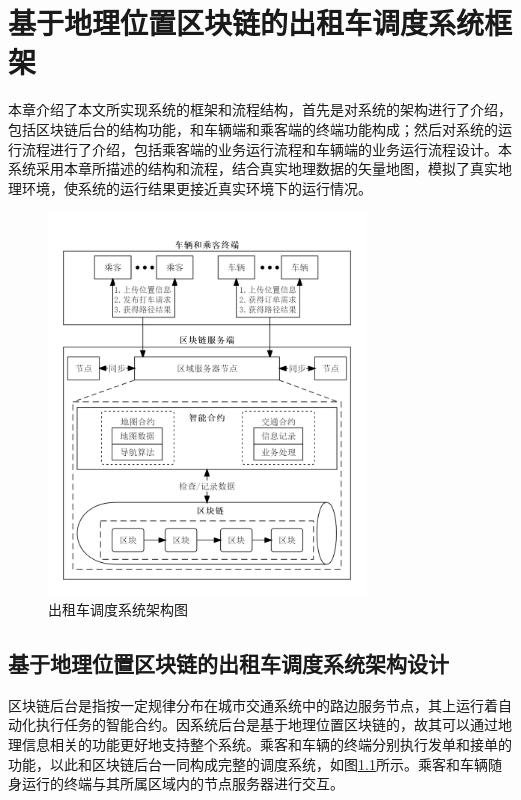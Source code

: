 \chapter{基于地理位置区块链的出租车调度系统框架}

本章介绍了本文所实现系统的框架和流程结构，首先是对系统的架构进行了介绍，包括区块链后台的结构功能，和车辆端和乘客端的终端功能构成；然后对系统的运行流程进行了介绍，包括乘客端的业务运行流程和车辆端的业务运行流程设计。本系统采用本章所描述的结构和流程，结合真实地理数据的矢量地图，模拟了真实地理环境，使系统的运行结果更接近真实环境下的运行情况。
\begin{figure}
  \centering
  \includegraphics[width=0.75\textwidth]{figures/structure}
  \caption{出租车调度系统架构图}\label{fig:structure}
\end{figure}

\section{基于地理位置区块链的出租车调度系统架构设计}
区块链后台是指按一定规律分布在城市交通系统中的路边服务节点，其上运行着自动化执行任务的智能合约。因系统后台是基于地理位置区块链的，故其可以通过地理信息相关的功能更好地支持整个系统。乘客和车辆的终端分别执行发单和接单的功能，以此和区块链后台一同构成完整的调度系统，如图\ref{fig:structure}所示。乘客和车辆随身运行的终端与其所属区域内的节点服务器进行交互。

